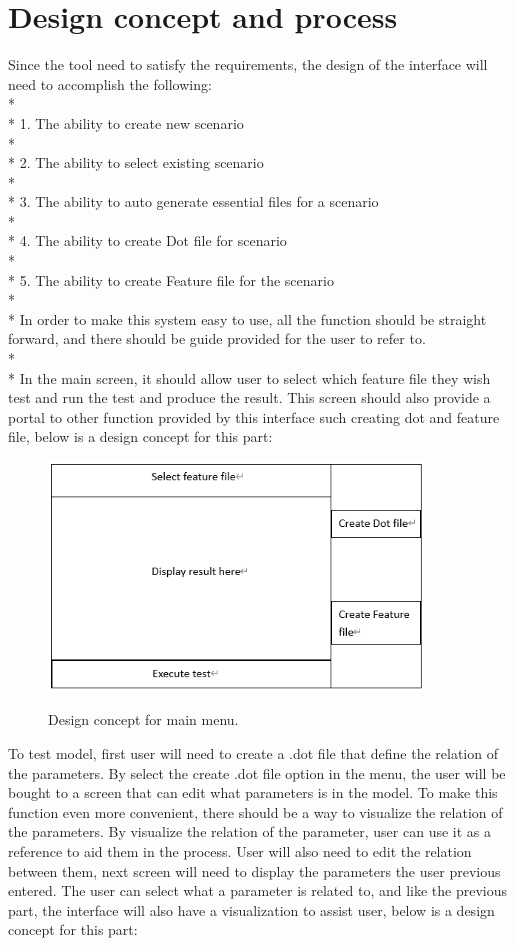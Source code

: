 \section{Design concept and process}
Since the tool need to satisfy the requirements, the design of the interface will need to accomplish the following:\\*
\\*
1.	The ability to create new scenario\\*
\\*
2.	The ability to select existing scenario\\*
\\*
3.	The ability to auto generate essential files for a scenario\\*
\\*
4.	The ability to create Dot file for scenario\\*
\\*
5.	The ability to create Feature file for the scenario\\*
\\*
In order to make this system easy to use, all the function should be straight forward, and there should be guide provided for the user to refer to. \\*\\*
In the main screen, it should allow user to select which feature file they wish test and run the test and produce the result. This screen should also provide a portal to other function provided by this interface such creating dot and feature file, below is a design concept for this part:

\begin{figure}[H]
	\centering
	\includegraphics[width=10cm]{figures/mainMenu.png}\\
	\caption{Design concept for main menu.}
	\label{fig:figure4}
\end{figure}
\noindent 
To test model, first user will need to create a .dot file that define the relation of the parameters. By select the create .dot file option in the menu, the user will be bought to a screen that can edit what parameters is in the model. To make this function even more convenient, there should be a way to visualize the relation of the parameters. By visualize the relation of the parameter, user can use it as a reference to aid them in the process. User will also need to edit the relation between them, next screen will need to display the parameters the user previous entered. The user can select what a parameter is related to, and like the previous part, the interface will also have a visualization to assist user, below is a design concept for this part:

